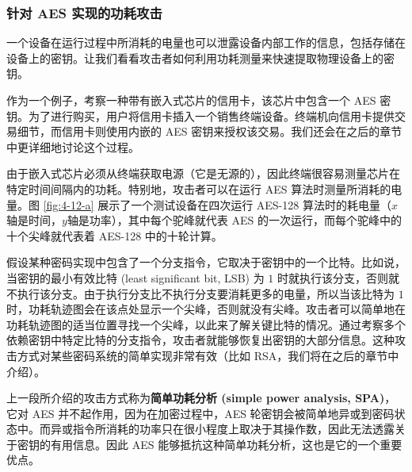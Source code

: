\subsubsection{针对 AES 实现的功耗攻击}

一个设备在运行过程中所消耗的电量也可以泄露设备内部工作的信息，包括存储在设备上的密钥。让我们看看攻击者如何利用功耗测量来快速提取物理设备上的密钥。

作为一个例子，考察一种带有嵌入式芯片的信用卡，该芯片中包含一个 AES 密钥。为了进行购买，用户将信用卡插入一个销售终端设备。终端机向信用卡提供交易细节，而信用卡则使用内嵌的 AES 密钥来授权该交易。我们还会在之后的章节中更详细地讨论这个过程。

由于嵌入式芯片必须从终端获取电源（它是无源的），因此终端很容易测量芯片在特定时间间隔内的功耗。特别地，攻击者可以在运行 AES 算法时测量所消耗的电量。图 \ref{fig:4-12-a} 展示了一个测试设备在四次运行 AES-128 算法时的耗电量（$x$轴是时间，$y$轴是功率），其中每个驼峰就代表 AES 的一次运行，而每个驼峰中的十个尖峰就代表着 AES-128 中的十轮计算。

\begin{snote}[简单功耗分析。]
假设某种密码实现中包含了一个分支指令，它取决于密钥中的一个比特。比如说，当密钥的最小有效比特 (least significant bit, LSB) 为 $1$ 时就执行该分支，否则就不执行该分支。由于执行分支比不执行分支要消耗更多的电量，所以当该比特为 $1$ 时，功耗轨迹图会在该点处显示一个尖峰，否则就没有尖峰。攻击者可以简单地在功耗轨迹图的适当位置寻找一个尖峰，以此来了解关键比特的情况。通过考察多个依赖密钥中特定比特的分支指令，攻击者就能够恢复出密钥的大部分信息。这种攻击方式对某些密码系统的简单实现非常有效（比如 RSA，我们将在之后的章节中介绍）。

上一段所介绍的攻击方式称为\textbf{简单功耗分析 (simple power analysis, SPA)}，它对 AES 并不起作用，因为在加密过程中，AES 轮密钥会被简单地异或到密码状态中。而异或指令所消耗的功率只在很小程度上取决于其操作数，因此无法透露关于密钥的有用信息。因此 AES 能够抵抗这种简单功耗分析，这也是它的一个重要优点。
\end{snote}

